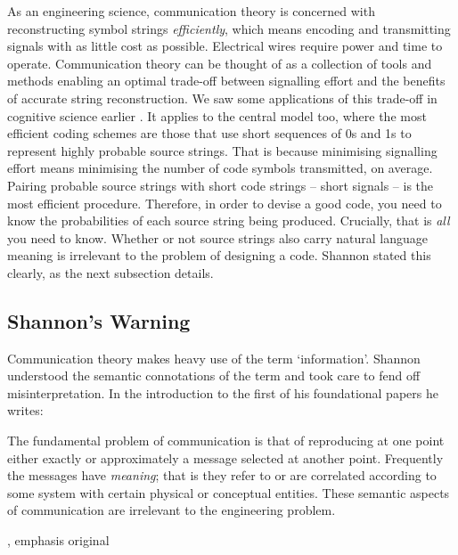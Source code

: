 \documentclass[12pt]{article}
\begin{document}
As an engineering science, communication theory is concerned with reconstructing symbol strings \textit{efficiently}, which means encoding and transmitting signals with as little cost as possible.
Electrical wires require power and time to operate.
Communication theory can be thought of as a collection of tools and methods enabling an optimal trade-off between signalling effort and the benefits of accurate string reconstruction.
We saw some applications of this trade-off in cognitive science earlier \citep{martinez2019representations,martinez2019deception,sims2016ratedistortion}.
It applies to the central model too, where the most efficient coding schemes are those that use short sequences of 0s and 1s to represent highly probable source strings.
That is because minimising signalling effort means minimising the number of code symbols transmitted, on average.
Pairing probable source strings with short code strings -- short signals -- is the most efficient procedure.
Therefore, in order to devise a good code, you need to know the probabilities of each source string being produced.
Crucially, that is \textit{all} you need to know.
Whether or not source strings also carry natural language meaning is irrelevant to the problem of designing a code.
Shannon stated this clearly, as the next subsection details.


\subsection{Shannon's Warning}\label{subsec:warning}

Communication theory makes heavy use of the term `information'.
Shannon understood the semantic connotations of the term and took care to fend off misinterpretation.
In the introduction to the first of his foundational papers he writes:

\begin{myquote}
The fundamental problem of communication is that of reproducing at one point either exactly or approximately a message selected at another point. Frequently the messages have \emph{meaning}; that is they refer to or are correlated according to some system with certain physical or conceptual entities. These semantic aspects of communication are irrelevant to the engineering problem.
\par\hspace*{\fill}\citet[379]{shannon1948mathematicalc}, emphasis original
\end{myquote}
\end{document}
